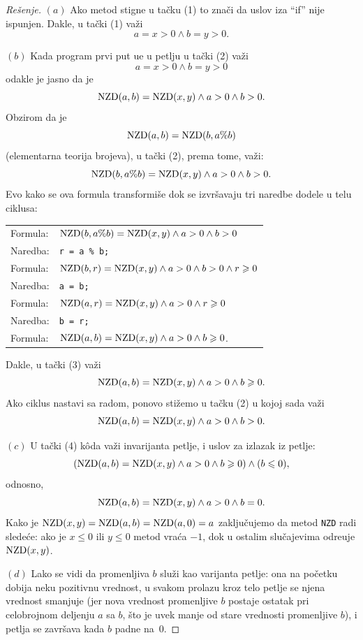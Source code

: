 \begin{proof}[Re\v senje]
  $(a)$
  Ako metod stigne u ta\v cku (1) to zna\v ci da uslov iza \enquote{if} nije ispunjen. Dakle, u ta\v cki (1)
  va\v zi
  $$
    a = x > 0 \land b = y > 0.
  $$

  $(b)$
  Kada program prvi put u\dj e u petlju u ta\v cki (2) va\v zi
  $$
    a = x > 0 \land b = y > 0
  $$
  odakle je jasno da je
  $$
    \mathrm{NZD}(a, b) = \mathrm{NZD}(x, y) \land a > 0 \land b > 0.
  $$
  Obzirom da je
  $$
    \mathrm{NZD}(a, b) = \mathrm{NZD}(b, a \% b)
  $$
  (elementarna teorija brojeva), u ta\v cki (2), prema tome, va\v zi:
  $$
    \mathrm{NZD}(b, a \% b) = \mathrm{NZD}(x, y) \land a > 0 \land b > 0.
  $$
  Evo kako se ova formula transformi\v se dok se izvr\v savaju tri naredbe dodele u telu ciklusa:
  \begin{center}
    \begin{tabular}{ll}
      Formula: & $\mathrm{NZD}(b, a \% b) = \mathrm{NZD}(x, y) \land a > 0 \land b > 0$\\
      Naredba: & \verb"r = a % b;"\\
      Formula: & $\mathrm{NZD}(b, r) = \mathrm{NZD}(x, y) \land a > 0 \land b > 0 \land r \geqslant 0$\\
      Naredba: & \verb"a = b;"\\
      Formula: & $\mathrm{NZD}(a, r) = \mathrm{NZD}(x, y) \land a > 0 \land r \geqslant 0$\\
      Naredba: & \verb"b = r;"\\
      Formula: & $\mathrm{NZD}(a, b) = \mathrm{NZD}(x, y) \land a > 0 \land b \geqslant 0$.
    \end{tabular}
  \end{center}
  Dakle, u ta\v cki (3) va\v zi
  $$
    \mathrm{NZD}(a, b) = \mathrm{NZD}(x, y) \land a > 0 \land b \geqslant 0.
  $$
  Ako ciklus nastavi sa radom, ponovo sti\v zemo u ta\v cku (2)
  u kojoj sada va\v zi
  $$
    \mathrm{NZD}(a, b) = \mathrm{NZD}(x, y) \land a > 0 \land b > 0.
  $$

  $(c)$
  U ta\v cki (4) k\^oda va\v zi invarijanta petlje, i uslov za izlazak iz petlje:
  $$
    (\mathrm{NZD}(a, b) = \mathrm{NZD}(x, y) \land a > 0 \land b \geqslant 0) \land (b \leqslant 0),
  $$
  odnosno,
  $$
    \mathrm{NZD}(a, b) = \mathrm{NZD}(x, y) \land a > 0 \land b = 0.
  $$
  Kako je $\mathrm{NZD}(x, y) = \mathrm{NZD}(a, b) = \mathrm{NZD}(a, 0) = a$ zaklju\v cujemo da
  metod \verb"NZD" radi slede\'ce: ako je $x \le 0$ ili $y \le 0$ metod vra\'ca $-1$, dok u ostalim slu\v cajevima
  odre\dj uje $\mathrm{NZD}(x, y)$.

  $(d)$
  Lako se vidi da promenljiva $b$ slu\v zi kao varijanta petlje: ona na po\v cetku dobija neku pozitivnu vrednost,
  u svakom prolazu kroz telo petlje se njena vrednost smanjuje (jer nova vrednost promenljive $b$ postaje ostatak pri celobrojnom deljenju
  $a$ sa $b$, \v sto je uvek manje od stare vrednosti promenljive $b$), i petlja se zavr\v sava kada $b$ padne na~$0$.
\end{proof}


